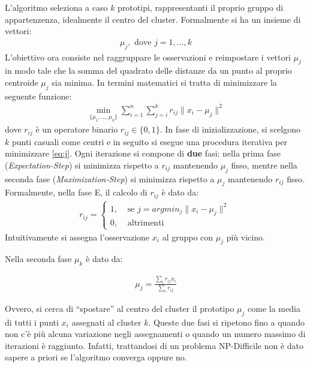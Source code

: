 L'algoritmo seleziona a caso $k$ prototipi, rappresentanti il proprio gruppo di appartenzenza, idealmente il centro del cluster. Formalmente si ha un insieme di vettori:
\begin{align*}
	\mu_j, \text{ dove } j = 1, \dots, k
\end{align*}
L'obiettivo ora consiste nel raggruppare le osservazioni e reimpostare i vettori $\mu_j$ in modo tale che la somma del quadrato delle distanze da un punto al proprio centroide $\mu_j$ sia minima. In termini matematici si tratta di minimizzare la seguente funzione:
\begin{align}
	\min_{\{\mu_1, \dots, \mu_k\}} \sum_{i=1}^n \sum_{j=i}^k r_{ij} \| x_i - \mu_j \|^2\label{eq:j}
\end{align}
dove $r_{ij}$ è un operatore binario $r_{ij} \in \{ 0, 1 \}$. In fase di inizializzazione, si scelgono $k$ punti casuali come centri e in seguito si esegue una procedura iterativa per minimizzare \eqref{eq:j}. Ogni iterazione si compone di \textbf{due} fasi: nella prima fase (\emph{Expectation-Step}) si minimizza rispetto a $r_{ij}$ mantenendo $\mu_j$ fisso, mentre nella seconda fase (\emph{Maximization-Step}) si minimizza rispetto a $\mu_j$ mantenendo $r_{ij}$ fisso. Formalmente, nella fase E, il calcolo di $r_{ij}$ è dato da:
\begin{align*}
	r_{ij} =
	\begin{cases}
		1, &\text{ se }j = argmin_j \| x_i - \mu_j \|^2 \\
		0, &\text{ altrimenti}
	\end{cases}
\end{align*}
Intuitivamente si assegna l’osservazione $x_i$ al gruppo con $\mu_j$ più vicino.

\newpage

Nella seconda fase $\mu_k$ è dato da:

\begin{align*}
	\mu_j = \frac{\displaystyle\sum_i r_{ij} x_i}{\displaystyle\sum_i r_{ij}}
\end{align*}

Ovvero, si cerca di “spostare” al centro del cluster il prototipo $\mu_j$ come la media di tutti i punti $x_i$ assegnati al cluster $k$. Queste due fasi si ripetono fino a quando non c'è più alcuna variazione negli assegnamenti o quando un numero massimo di iterazioni è raggiunto. Infatti, trattandosi di un problema NP-Difficile non è dato sapere a priori se l'algoritmo converga oppure no.

